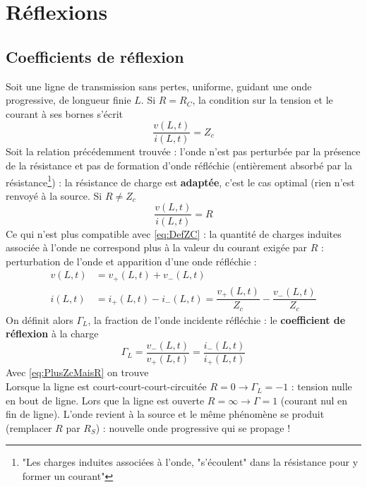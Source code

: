 \section{Réflexions}
	\subsection{Coefficients de réflexion}
	Soit une ligne de transmission sans pertes, uniforme, guidant une onde progressive, 
	de longueur finie $L$. Si $R=R_C$, la condition sur la tension et le courant à ses 
	bornes s'écrit
	\begin{equation}
	\dfrac{v(L,t)}{i(L,t)} = Z_c
	\end{equation}
	Soit la relation précédemment trouvée : l'onde n'est pas perturbée par la présence de 
	la résistance et pas de formation d'onde réfléchie (entièrement absorbé par la 
	résistance\footnote{"Les charges induites associées à l'onde, "s'écoulent" dans la 
	résistance pour y former un courant"}) : la résistance de charge est \textbf{adaptée}, 
	c'est le cas optimal (rien n'est renvoyé à la source. Si $R\neq Z_c$ 
	\begin{equation}
	\dfrac{v(L,t)}{i(L,t)} = R
	\label{eq:PlusZcMaisR}
	\end{equation}
	Ce qui n'est plus compatible avec \autoref{eq:DefZC} : la quantité de charges induites 
	associée à l'onde ne correspond plus à la valeur du courant exigée par $R$ : perturbation 
	de l'onde et apparition d'une onde réfléchie :
	\begin{equation}
	\begin{array}{ll}
	v(L,t) &= v_+(L,t) + v_-(L,t)\\
	i(L,t) &= i_+(L,t) - i_-(L,t)	= \dfrac{v_+(L,t)}{Z_c}-\dfrac{v_-(L,t)}{Z_c}
	\end{array}
	\end{equation}
	On définit alors $\Gamma_L$, la fraction de l'onde incidente réfléchie : le 
	\textbf{coefficient de réflexion} à la charge
	\begin{equation}
	\Gamma_L = \dfrac{v_-(L,t)}{v_+(L,t)} = \dfrac{i_-(L,t)}{i_+(L,t)}
	\end{equation}
	Avec \autoref{eq:PlusZcMaisR} on trouve\\
	Lorsque la ligne est court-court-court-circuitée $R=0 \rightarrow \Gamma_L=-1$ : tension nulle en 
	bout de ligne. Lors que la ligne est ouverte $R=\infty \rightarrow \Gamma = 1$ (courant 
	nul en fin de ligne). L'onde revient à la source et le même phénomène se produit (remplacer 
	$R$ par $R_S$) : nouvelle onde progressive qui se propage !
	
